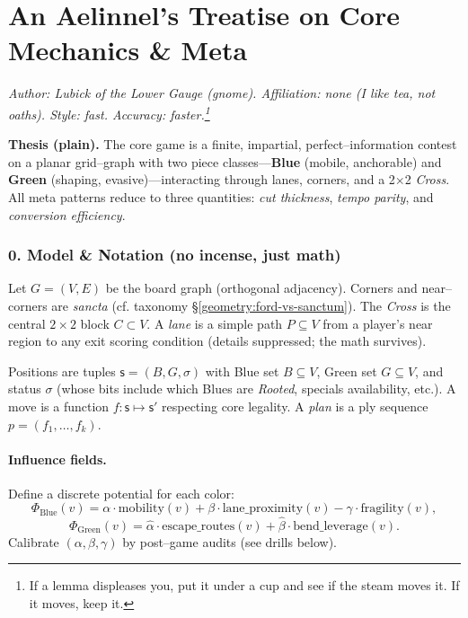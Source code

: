 \documentclass[11pt]{article}
\numberwithin{equation}{section} %
\theoremstyle{plain} %
\theoremstyle{definition} %
\theoremstyle{remark} %
\begin{document}
\clearpage
\section{An Aelinnel’s Treatise on Core Mechanics \& Meta}
\label{geometry:aelinnel-core}

\noindent\textit{Author: Lubick of the Lower Gauge (gnome). Affiliation: none (I like tea, not oaths). Style: fast. Accuracy: faster.\footnote{If a lemma displeases you, put it under a cup and see if the steam moves it. If it moves, keep it.}}

\medskip
\noindent\textbf{Thesis (plain).} The core game is a finite, impartial, perfect–information contest on a planar grid–graph with two piece classes—\textbf{Blue} (mobile, anchorable) and \textbf{Green} (shaping, evasive)—interacting through lanes, corners, and a 2\(\times\)2 \emph{Cross}. All meta patterns reduce to three quantities: \emph{cut thickness}, \emph{tempo parity}, and \emph{conversion efficiency}.

\subsubsection{0. Model \& Notation (no incense, just math)}
Let \(G=(V,E)\) be the board graph (orthogonal adjacency). Corners and near–corners are \emph{sancta} (cf. taxonomy \S\ref{geometry:ford-vs-sanctum}). The \emph{Cross} is the central \(2\times2\) block \(C\subset V\). A \emph{lane} is a simple path \(P\subseteq V\) from a player’s near region to any exit scoring condition (details suppressed; the math survives). 

Positions are tuples \(\mathsf{s}=(B,G,\sigma)\) with Blue set \(B\subseteq V\), Green set \(G\subseteq V\), and status \(\sigma\) (whose bits include which Blues are \emph{Rooted}, specials availability, etc.). A move is a function \(f:\mathsf{s}\mapsto \mathsf{s}'\) respecting core legality. A \emph{plan} is a ply sequence \(p=(f_1,\dots,f_k)\).

\paragraph{Influence fields.} Define a discrete potential for each color:
\[
\Phi_{\text{Blue}}(v)= \alpha\cdot \text{mobility}(v) + \beta\cdot \text{lane\_proximity}(v) - \gamma\cdot \text{fragility}(v),
\]
\[
\Phi_{\text{Green}}(v)= \hat{\alpha}\cdot \text{escape\_routes}(v) + \hat{\beta}\cdot \text{bend\_leverage}(v).
\]
Calibrate \((\alpha,\beta,\gamma)\) by post–game audits (see drills below).
\end{document}
